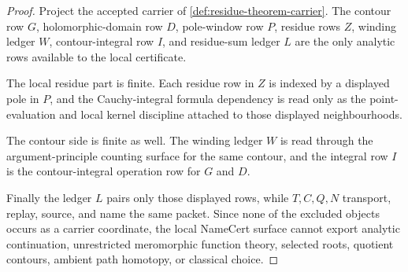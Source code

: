 \begin{proof}
Project the accepted carrier of \autoref{def:residue-theorem-carrier}. The contour row $G$, holomorphic-domain row $D$, pole-window row $P$, residue rows $Z$, winding ledger $W$, contour-integral row $I$, and residue-sum ledger $L$ are the only analytic rows available to the local certificate.

The local residue part is finite. Each residue row in $Z$ is indexed by a displayed pole in $P$, and the Cauchy-integral formula dependency is read only as the point-evaluation and local kernel discipline attached to those displayed neighbourhoods.

The contour side is finite as well. The winding ledger $W$ is read through the argument-principle counting surface for the same contour, and the integral row $I$ is the contour-integral operation row for $G$ and $D$.

Finally the ledger $L$ pairs only those displayed rows, while $T,C,Q,N$ transport, replay, source, and name the same packet. Since none of the excluded objects occurs as a carrier coordinate, the local NameCert surface cannot export analytic continuation, unrestricted meromorphic function theory, selected roots, quotient contours, ambient path homotopy, or classical choice.
\end{proof}




